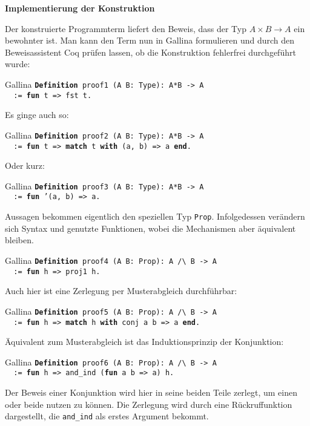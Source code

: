 \documentclass[8pt]{beamer}
\newcommand{\strong}[1]{\textsf{\textbf{#1}}}
\newcommand{\parspace}{\vspace{0.8em}}
\newcommand{\kw}[1]{\textbf{#1}}
\begin{document}
\begin{frame}[t]
\strong{Implementierung der Konstruktion}

\vspace{4em}
Der konstruierte Programmterm liefert den Beweis, dass der Typ
$A\times B\to A$ ein bewohnter ist. Man kann den Term nun in
Gallina formulieren und durch den Beweisassistent Coq prüfen lassen,
ob die Konstruktion fehlerfrei durchgeführt wurde:\pause

\begin{block}{Gallina}
\texttt{\kw{Definition} proof1 (A B: Type): A*B -> A\\
\ \ := \kw{fun} t => fst t.}
\end{block}\pause

\parspace
Es ginge auch so:
\begin{block}{Gallina}
\texttt{\kw{Definition} proof2 (A B: Type): A*B -> A\\
\ \ := \kw{fun} t => \kw{match} t \kw{with} (a, b) => a \kw{end}.}
\end{block}
Oder kurz:
\begin{block}{Gallina}
\texttt{\kw{Definition} proof3 (A B: Type): A*B -> A\\
\ \ := \kw{fun} '(a, b) => a.}
\end{block}
\end{frame}

\begin{frame}
Aussagen bekommen eigentlich den speziellen Typ \texttt{Prop}.
Infolgedessen verändern sich Syntax und genutzte Funktionen,
wobei die Mechanismen aber äquivalent bleiben.
\begin{block}{Gallina}
\texttt{\kw{Definition} proof4 (A B: Prop): A /{\textbackslash} B -> A\\
\ \ := \kw{fun} h => proj1 h.}
\end{block}\pause
Auch hier ist eine Zerlegung per Musterabgleich durchführbar:
\begin{block}{Gallina}
\texttt{\kw{Definition} proof5 (A B: Prop): A /{\textbackslash} B -> A\\
\ \ := \kw{fun} h => \kw{match} h \kw{with} conj a b => a \kw{end}.}
\end{block}\pause
Äquivalent zum Musterabgleich ist das Induktionsprinzip der Konjunktion:
\begin{block}{Gallina}
\texttt{\kw{Definition} proof6 (A B: Prop): A /{\textbackslash} B -> A\\
\ \ := \kw{fun} h => and\_ind (\kw{fun} a b => a) h.}
\end{block}
Der Beweis einer Konjunktion wird hier in seine beiden Teile zerlegt,
um einen oder beide nutzen zu können. Die Zerlegung wird durch eine
Rückruffunktion dargestellt, die \texttt{and\_ind} als erstes Argument
bekommt.
\end{frame}
\end{document}

